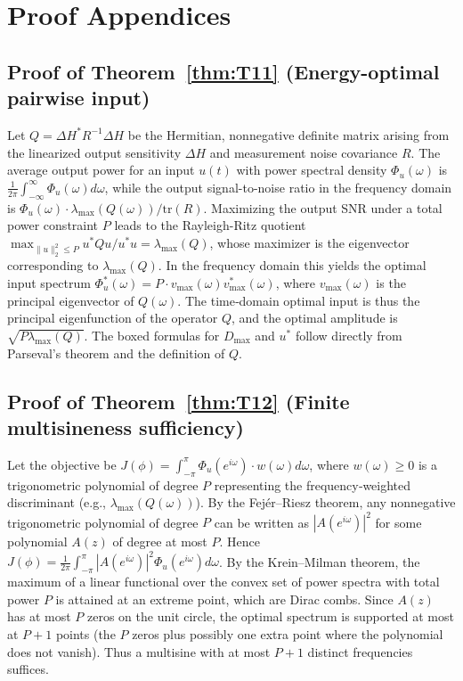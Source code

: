 \section{Proof Appendices}
\label{sec:appendices}

\subsection{Proof of Theorem~\ref{thm:T11} (Energy-optimal pairwise input)}
Let $Q = \Delta H^* R^{-1} \Delta H$ be the Hermitian, nonnegative definite matrix arising from the linearized output sensitivity $\Delta H$ and measurement noise covariance $R$. The average output power for an input $u(t)$ with power spectral density $\Phi_u(\omega)$ is $\frac{1}{2\pi}\int_{-\infty}^{\infty} \Phi_u(\omega) d\omega$, while the output signal-to-noise ratio in the frequency domain is $\Phi_u(\omega) \cdot \lambda_{\max}(Q(\omega))/\text{tr}(R)$. Maximizing the output SNR under a total power constraint $P$ leads to the Rayleigh-Ritz quotient $\max_{\|u\|_2^2\leq P} u^* Q u / u^* u = \lambda_{\max}(Q)$, whose maximizer is the eigenvector corresponding to $\lambda_{\max}(Q)$. In the frequency domain this yields the optimal input spectrum $\Phi_u^*(\omega) = P \cdot v_{\max}(\omega) v_{\max}^*(\omega)$, where $v_{\max}(\omega)$ is the principal eigenvector of $Q(\omega)$. The time‑domain optimal input is thus the principal eigenfunction of the operator $Q$, and the optimal amplitude is $\sqrt{P\lambda_{\max}(Q)}$. The boxed formulas for $D_{\max}$ and $u^*$ follow directly from Parseval’s theorem and the definition of $Q$.

\subsection{Proof of Theorem~\ref{thm:T12} (Finite multisineness sufficiency)}
Let the objective be $J(\phi) = \int_{-\pi}^{\pi} \Phi_u(e^{i\omega}) \cdot w(\omega) d\omega$, where $w(\omega)\ge 0$ is a trigonometric polynomial of degree $P$ representing the frequency‑weighted discriminant (e.g., $\lambda_{\max}(Q(\omega))$). By the Fejér–Riesz theorem, any nonnegative trigonometric polynomial of degree $P$ can be written as $|A(e^{i\omega})|^2$ for some polynomial $A(z)$ of degree at most $P$. Hence $J(\phi) = \frac{1}{2\pi}\int_{-\pi}^{\pi} |A(e^{i\omega})|^2 \Phi_u(e^{i\omega}) d\omega$. By the Krein–Milman theorem, the maximum of a linear functional over the convex set of power spectra with total power $P$ is attained at an extreme point, which are Dirac combs. Since $A(z)$ has at most $P$ zeros on the unit circle, the optimal spectrum is supported at most at $P+1$ points (the $P$ zeros plus possibly one extra point where the polynomial does not vanish). Thus a multisine with at most $P+1$ distinct frequencies suffices.

